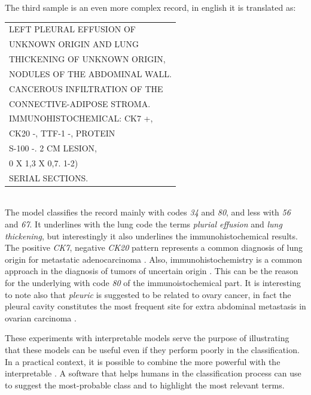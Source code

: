 The third sample is an even more complex record, in english it is
translated as:\\
\begin{small}
  \ttfamily
  \begin{tabular}{l}
    LEFT PLEURAL EFFUSION OF\\
    UNKNOWN ORIGIN AND LUNG\\
    THICKENING OF UNKNOWN ORIGIN,\\
    NODULES OF THE ABDOMINAL WALL.\\
    CANCEROUS INFILTRATION OF THE\\
    CONNECTIVE-ADIPOSE STROMA.\\
    IMMUNOHISTOCHEMICAL: CK7 +,\\
    CK20 -, TTF-1 -, PROTEIN\\
    S-100 -. 2 CM LESION,\\
    0 X 1,3 X 0,7. 1-2)\\
    SERIAL SECTIONS.
\end{tabular}
\end{small}\\
The model classifies the record mainly with codes \emph{34} and
\emph{80}, and less with \emph{56} and \emph{67}. It underlines with
the lung code the terms
\emph{plurial effusion} and \emph{lung thickening}, but interestingly
it also underlines the immunohistochemical results. The
positive \emph{CK7}, negative \emph{CK20} pattern represents a common
diagnosis 
of lung origin for metastatic adenocarcinoma
\cite{kummar2002cytokeratin}. Also, immunohistochemistry is a common
approach in the diagnosis of tumors of uncertain origin
\cite{duraiyan2012applications}. This can be the reason for the
underlying with code \emph{80} of the immunoistochemical part.
It is interesting to note also that \emph{pleuric} is
suggested to be related to ovary cancer, in fact the pleural cavity
constitutes the most frequent site for extra abdominal metastasis in
ovarian carcinoma \cite{porcel2012pleural}.

These experiments with interpretable models serve the purpose of
illustrating that these models can be useful even if they perform
poorly in the 
classification. In a practical context, it is
possible to combine the more powerful \maxp{} with the interpretable
\maxi{}. A software that helps humans in the classification process
can use \maxp{} to suggest the most-probable class and \maxi{} to
highlight the most relevant terms.

